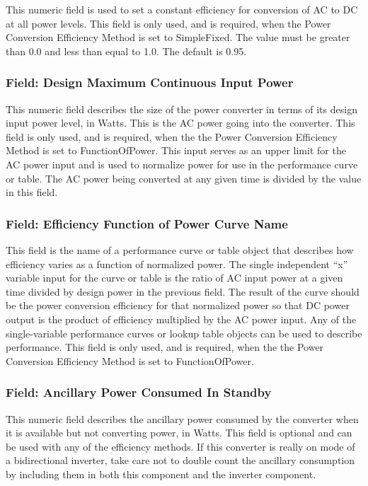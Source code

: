 This numeric field is used to set a constant efficiency for conversion of AC to DC at all power levels. This field is only used, and is required, when the Power Conversion Efficiency Method is set to SimpleFixed. The value must be greater than 0.0 and less than equal to 1.0. The default is 0.95.

\subsubsection{Field: Design Maximum Continuous Input Power}\label{field-design-maximum-continuous-input-power}

This numeric field describes the size of the power converter in terms of its design input power level, in Watts. This is the AC power going into the converter. This field is only used, and is required, when the the Power Conversion Efficiency Method is set to FunctionOfPower. This input serves as an upper limit for the AC power input and is used to normalize power for use in the performance curve or table. The AC power being converted at any given time is divided by the value in this field.

\subsubsection{Field: Efficiency Function of Power Curve Name}\label{field-efficiency-function-of-power-curve-name-1}

This field is the name of a performance curve or table object that describes how efficiency varies as a function of normalized power. The single independent ``x'' variable input for the curve or table is the ratio of AC input power at a given time divided by design power in the previous field. The result of the curve should be the power conversion efficiency for that normalized power so that DC power output is the product of efficiency multiplied by the AC power input. Any of the single-variable performance curves or lookup table objects can be used to describe performance. This field is only used, and is required, when the the Power Conversion Efficiency Method is set to FunctionOfPower.

\subsubsection{Field: Ancillary Power Consumed In Standby}\label{field-ancillary-power-consumed-in-standby-1}

This numeric field describes the ancillary power consumed by the converter when it is available but not converting power, in Watts. This field is optional and can be used with any of the efficiency methods. If this converter is really on mode of a bidirectional inverter, take care not to double count the ancillary consumption by including them in both this component and the inverter component.

